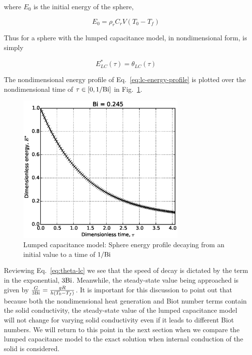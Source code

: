 where $E_0$ is the initial energy of the sphere,

\begin{equation}
    E_0=\rho_rC_rV(T_0-T_f)
\end{equation}

Thus for a sphere with the lumped capacitance model, in nondimensional form, is simply

\begin{equation}\label{eq:lc-energy-profile}
	E^*_{LC}(\tau) = \theta_{LC}(\tau)
\end{equation}

The nondimensional energy profile of Eq.~\ref{eq:lc-energy-profile} is plotted over the nondimensional time of $\tau \in [0,1/\mathrm{Bi}]$ in Fig.~\ref{fig:LC-sphere-in-fluid}. 

\begin{figure}[ht]
	\centering
		\includegraphics[width=0.75\textwidth]{chapters/figures/LC-sphere-in-fluid}
	\caption[Lumped Capacitance energy profile]{Lumped capacitance model: Sphere energy profile decaying from an initial value to a time of $1/\mathrm{Bi}$}
	\label{fig:LC-sphere-in-fluid}
\end{figure}

Reviewing Eq.~\ref{eq:theta-lc} we see that the speed of decay is dictated by the term in the exponential, $3\mathrm{Bi}$. Meanwhile, the steady-state value being approached is given by $\frac{G}{3\mathrm{Bi}} = \frac{gR}{h(T_0 - T_f)}$. It is important for this discussion to point out that because both the nondimensional heat generation and Biot number terms contain the solid conductivity, the steady-state value of the lumped capacitance model will not change for varying solid conductivity even if it leads to different Biot numbers. We will return to this point in the next section when we compare the lumped capacitance model to the exact solution when internal conduction of the solid is considered.



